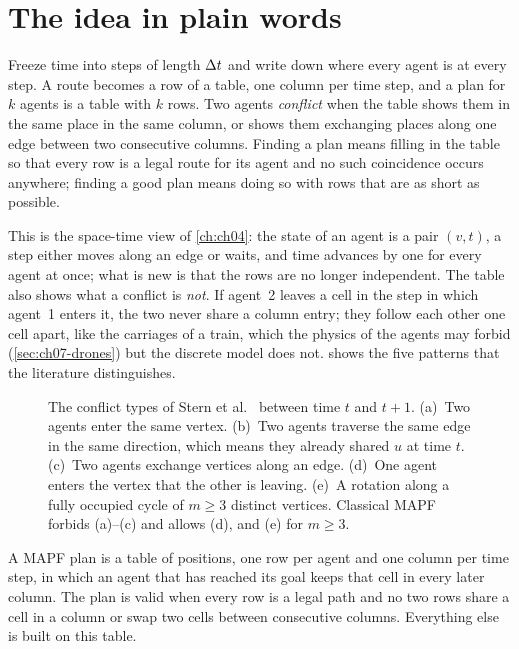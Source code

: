 \section{The idea in plain words}
\label{sec:ch07-intuition}

Freeze time into steps of length $\Delta t$ and write down where every agent is at
every step. A route becomes a row of a table, one column per time step, and a
plan for $k$ agents is a table with $k$ rows. Two agents \emph{conflict} when
the table shows them in the same place in the same column, or shows them
exchanging places along one edge between two consecutive columns. Finding a
plan means filling in the table so that every row is a legal route for its
agent and no such coincidence occurs anywhere; finding a good plan means doing
so with rows that are as short as possible.

This is the space-time view of \cref{ch:ch04}: the state of an agent is a pair
$(v, t)$, a step either moves along an edge or waits, and time advances by one
for every agent at once; what is new is that the rows are no longer
independent. The table also shows what a conflict is \emph{not}. If agent~2
leaves a cell in the step in which agent~1 enters it, the two never share a
column entry; they follow each other one cell apart, like the carriages of a
train, which the physics of the agents may forbid (\cref{sec:ch07-drones})
but the discrete model does not.  shows the five patterns that the
literature distinguishes.

\begin{figure}[!htb]
  \centering
  \caption{The conflict types of Stern et al.\ \cite{stern2019mapf} between
  time $t$ and $t+1$. (a)~Two agents enter the same vertex. (b)~Two agents
  traverse the same edge in the same direction, which means they already
  shared $u$ at time $t$. (c)~Two agents exchange vertices along an edge.
  (d)~One agent enters the vertex that the other is leaving. (e)~A rotation
  along a fully occupied cycle of $m \ge 3$ distinct vertices. Classical MAPF
  forbids (a)--(c) and allows (d), and (e) for $m \ge 3$.}
  \label{fig:ch07-conflict-types}
\end{figure}

\begin{keyidea}
A MAPF plan is a table of positions, one row per agent and one column per
time step, in which an agent that has reached its goal keeps that cell in
every later column. The plan is valid when every row is a legal path and no
two rows share a cell in a column or swap two cells between consecutive
columns. Everything else is built on this table.
\end{keyidea}

